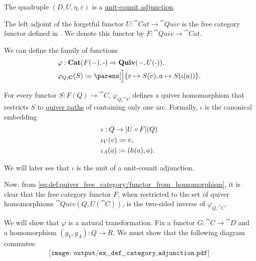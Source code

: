 \begin{example}
\begin{thmenum}
    The quadruple \( (D, U, \eta, \varepsilon) \) is a \hyperref[def:category_adjunction/unit_counit]{unit-counit adjunction}.

     The left adjoint of the forgetful functor \( U: \cat{Cat} \to \cat{Quiv} \) is the free category functor defined in . We denote this functor by \( F: \cat{Quiv} \to \cat{Cat} \).

    We can define the family of functions
    \begin{equation}\label{eq:ex:def:category_adjunction/quiv_cat/varphi_family}
      \begin{aligned}
        &\varphi: \cat{Cat}(F(\anon*), \cat{\anon*}) \Rightarrow \cat{Quiv}(\anon*, U(\cat{\anon*})), \\
        &\varphi_{Q, \cat{C}}(S) \coloneqq \parens[\Big]{ v \mapsto S(v), a \mapsto S(\iota(a)) }.
      \end{aligned}
    \end{equation}

    For every functor \( S: F(Q) \to \cat{C} \), \( \varphi_{Q, \cat{C}} \) defines a quiver homomorphism that restricts \( S \) to \hyperref[def:quiver_path]{quiver paths} of containing only one arc. Formally, \( \iota \) is the canonical embedding
    \begin{equation*}
      \begin{aligned}
        &\iota: Q \to [U \bincirc F](Q) \\
        &\iota_V(v) \coloneqq v, \\
        &\iota_A(a) \coloneqq (h(a), a).
      \end{aligned}
    \end{equation*}

    We will later see that \( \iota \) is the unit of a unit-counit adjunction.

    Now, from \eqref{eq:def:quiver_free_category/functor_from_homomorphism}, it is clear that the free category functor \( F \), when restricted to the set of quiver homomorphisms \( \cat{Quiv}(Q, U(\cat{C})) \), is the two-sided inverse of \( \varphi_{Q, \cat{C}} \).

    We will show that \( \varphi \) is a natural transformation. Fix a functor \( G: \cat{C} \to \cat{D} \) and a homomorphism \( (g_V, g_A): Q \to R \). We must show that the following diagram commutes:
    \begin{equation}\label{eq:ex:def:category_adjunction/quiv_cat/varphi_nat}
      \begin{aligned}
        \texttt{[image: output/ex\_\_def\_\_category\_adjunction.pdf]}
      \end{aligned}
    \end{equation}


\end{thmenum}
\end{example}
